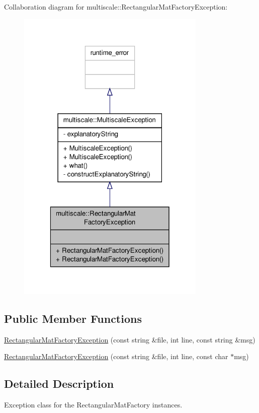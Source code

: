 Collaboration diagram for multiscale\-:\-:Rectangular\-Mat\-Factory\-Exception\-:\nopagebreak
\begin{figure}[H]
\begin{center}
\leavevmode
\includegraphics[width=256pt]{classmultiscale_1_1RectangularMatFactoryException__coll__graph}
\end{center}
\end{figure}
\subsection*{Public Member Functions}
\begin{DoxyCompactItemize}
\item 
\hyperlink{classmultiscale_1_1RectangularMatFactoryException_a08ba7e88c5b1af7df82e4c376287bedf}{Rectangular\-Mat\-Factory\-Exception} (const string \&file, int line, const string \&msg)
\item 
\hyperlink{classmultiscale_1_1RectangularMatFactoryException_aca0beb9e5c613533ddafff4118ddf2d0}{Rectangular\-Mat\-Factory\-Exception} (const string \&file, int line, const char $\ast$msg)
\end{DoxyCompactItemize}


\subsection{Detailed Description}
Exception class for the Rectangular\-Mat\-Factory instances. 

